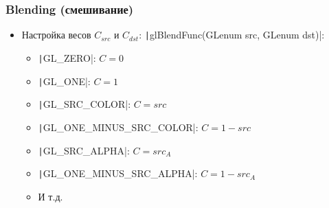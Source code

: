 \documentclass[10pt]{beamer}
\begin{document}
\begin{frame}[fragile]
\frametitle{Blending (смешивание)}
\begin{itemize}
\item Настройка весов \begin{math}C_{src}\end{math} и \begin{math}C_{dst}\end{math}: \texttt|glBlendFunc(GLenum src, GLenum dst)|:
\pause
\begin{itemize}
\item \texttt|GL_ZERO|: \begin{math}C = 0\end{math}
\pause
\item \texttt|GL_ONE|: \begin{math}C = 1\end{math}
\pause
\item \texttt|GL_SRC_COLOR|: \begin{math}C = src\end{math}
\pause
\item \texttt|GL_ONE_MINUS_SRC_COLOR|: \begin{math}C = 1 - src\end{math}
\pause
\item \texttt|GL_SRC_ALPHA|: \begin{math}C = src_A\end{math}
\pause
\item \texttt|GL_ONE_MINUS_SRC_ALPHA|: \begin{math}C = 1 - src_A\end{math}
\item И т.д.
\end{itemize}
\end{itemize}
\end{frame}
\end{document}
